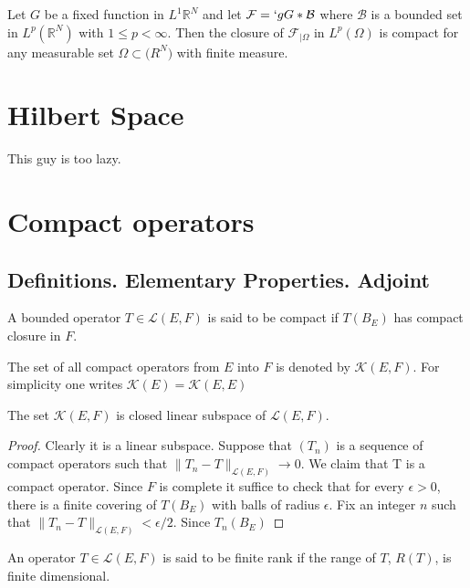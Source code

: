 \documentclass[a4paper]{book}
\begin{document}
    \begin{cor}
    Let ${G}$ be a fixed function in $L^1{\mathbb R^N}$ and let $\mathcal{F}=`g{G}*\mathcal{B}$ where $\mathcal{B}$ is a bounded set in $L^p(\mathbb R^N)$ with  $1 \le p < \infty$. Then the closure of $\mathcal{F}_{|\Omega}$ in $L^p(\Omega)$ is compact for any measurable set $\Omega \subset \mathbb(R^N)$ with finite measure.
    \end{cor}

  \chapter{Hilbert Space}
  This guy is too lazy.
  \chapter{Compact operators}
  \section{Definitions. Elementary Properties. Adjoint}
  \newcommand{\li}[1]{ \mathcal {#1} }
  \newcommand{\norm}[2]{ \| {#1} \| _{#2} }
  \newcommand{\ball}[1]{(B_{#1})}
  \newcommand{\ep}{\epsilon}
    \begin{defi}
         A bounded operator $T \in \li L (E,F) $ is said to be compact if $T(B_E)$ has compact closure in $F$.
    \end{defi}
    The set of all compact operators from $E$ into $F$ is denoted by $\li K (E,F)$. For simplicity one writes $\li K (E)= \li K(E,E)$
    \begin{thm}
      The set $\mathcal K(E,F)$ is closed linear subspace of $\li L (E,F)$.
    \begin{proof}
      Clearly it is a linear subspace. Suppose that $(T_n)$ is a sequence of compact operators such that $\norm {T_n - T}{\li L(E,F)} \rightarrow 0$. We claim that T is a compact operator. Since $F$ is complete it suffice to check that for every $\ep > 0$, there is a finite covering of $T \ball E$ with balls of radius $\epsilon$. Fix an integer $n$ such that $\norm {T_n - T} {\li L(E,F)} < \ep/2 $. Since $T_n \ball E$
    \end{proof}
    \end{thm}
    \begin{defi}
        An operator $T \in \li L(E,F)$ is said to be finite rank if the range of $T$, $R(T)$, is finite dimensional.
    \end{defi}
\end{document}
